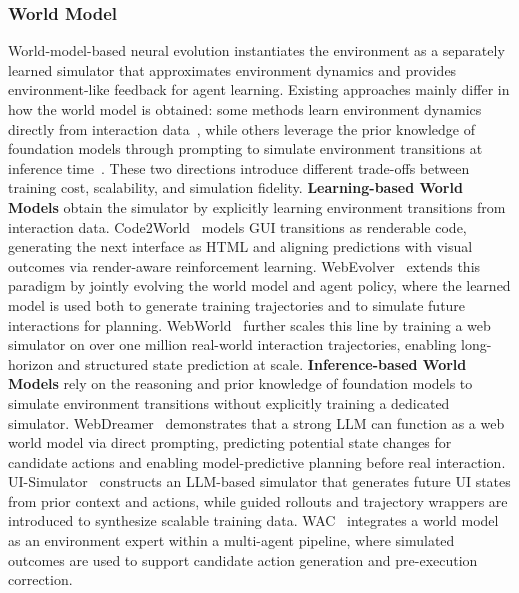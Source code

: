 \subsubsection{World Model}\label{sec:world_model}
World-model-based neural evolution instantiates the environment as a separately learned simulator that approximates environment dynamics and provides environment-like feedback for agent learning.
%
Existing approaches mainly differ in how the world model is obtained: some methods learn environment dynamics directly from interaction data~\cite{Code2World,WebEvolver,WebWorld}, while others leverage the prior knowledge of foundation models through prompting to simulate environment transitions at inference time~\cite{WebDreamer,UI-Simulator,WAC}.
These two directions introduce different trade-offs between training cost, scalability, and simulation fidelity.
%
\textbf{Learning-based World Models} obtain the simulator by explicitly learning environment transitions from interaction data.
Code2World~\cite{Code2World} models GUI transitions as renderable code, generating the next interface as HTML and aligning predictions with visual outcomes via render-aware reinforcement learning.
WebEvolver~\cite{WebEvolver} extends this paradigm by jointly evolving the world model and agent policy, where the learned model is used both to generate training trajectories and to simulate future interactions for planning.
WebWorld~\cite{WebWorld} further scales this line by training a web simulator on over one million real-world interaction trajectories, enabling long-horizon and structured state prediction at scale.
%
\textbf{Inference-based World Models} rely on the reasoning and prior knowledge of foundation models to simulate environment transitions without explicitly training a dedicated simulator.
WebDreamer~\cite{WebDreamer} demonstrates that a strong LLM can function as a web world model via direct prompting, predicting potential state changes for candidate actions and enabling model-predictive planning before real interaction.
UI-Simulator~\cite{UI-Simulator} constructs an LLM-based simulator that generates future UI states from prior context and actions, while guided rollouts and trajectory wrappers are introduced to synthesize scalable training data.
WAC~\cite{WAC} integrates a world model as an environment expert within a multi-agent pipeline, where simulated outcomes are used to support candidate action generation and pre-execution correction.
%
